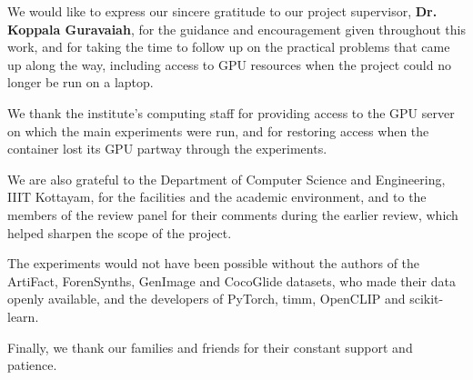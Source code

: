 We would like to express our sincere gratitude to our project supervisor,
\textbf{Dr. Koppala Guravaiah}, for the guidance and encouragement given
throughout this work, and for taking the time to follow up on the practical problems that
came up along the way, including access to GPU resources when the project could
no longer be run on a laptop.

We thank the institute's computing staff for providing
access to the GPU server on which the main experiments were run, and for
restoring access when the container lost its GPU partway through the
experiments.

We are also grateful to the Department of Computer Science and Engineering,
IIIT Kottayam, for the facilities and the academic environment, and to the
members of the review panel for their comments during the earlier review,
which helped sharpen the scope of the project.

The experiments would not have been possible without the authors of the
ArtiFact, ForenSynths, GenImage and CocoGlide datasets, who made their data
openly available, and the developers of PyTorch, timm, OpenCLIP and
scikit-learn.

Finally, we thank our families and friends for their constant support and patience.
